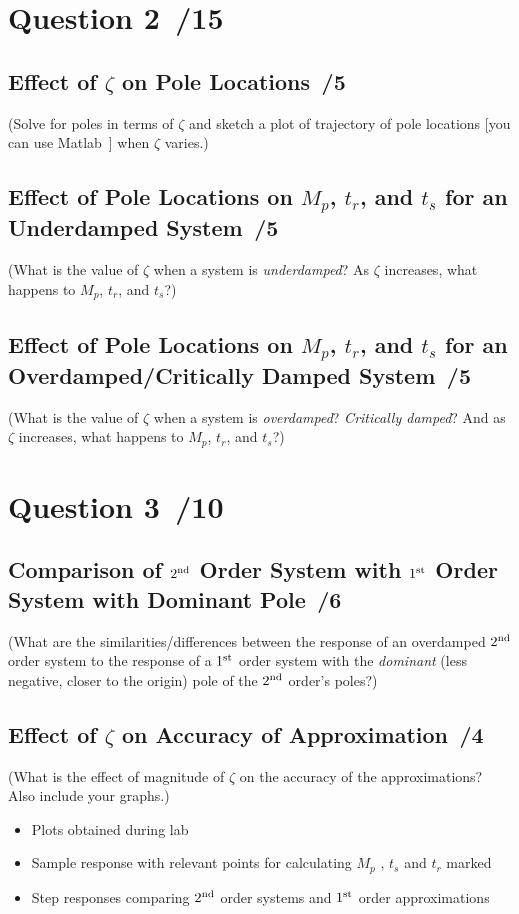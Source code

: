 \documentclass{article}
\newcommand{\score}{\hfill \underline{\hspace{0.65cm}}\,/} %
\newcommand\RR{\textsuperscript{\textregistered}~} %
\begin{document}
\section*{Question 2 \score 15}

\subsection*{Effect of $\zeta$ on Pole Locations \score 5}
(Solve for poles in terms of $\zeta$ and sketch a plot of trajectory of pole locations [you can use {\sc Matlab\RR}] when $\zeta$ varies.)

\subsection*{Effect of Pole Locations on $M_p$, $t_r$, and $t_s$ for an Underdamped System \score 5}
(What is the value of $\zeta$ when a system is \emph{underdamped}? As $\zeta$ increases, what happens to $M_p$, $t_r$, and $t_s$?)

\subsection*{Effect of Pole Locations on $M_p$, $t_r$, and $t_s$ for an Overdamped/Critically Damped System \score 5}
(What is the value of $\zeta$ when a system is \emph{overdamped}? \emph{Critically damped}? And as $\zeta$ increases, what happens to $M_p$, $t_r$, and $t_s$?)

\section*{Question 3 \score 10}

\subsection*{Comparison of $2^{\rm nd}$ Order System with $1^{\rm st}$ Order System with Dominant Pole \score 6}
(What are the similarities/differences between the response of an overdamped $2^{\rm nd}$ order system to the response of a $1^{\rm st}$ order system with the \emph{dominant} (less negative, closer to the origin) pole of the $2^{\rm nd}$ order's poles?)

\subsection*{Effect of $\zeta$ on Accuracy of Approximation \score 4}
(What is the effect of magnitude of $\zeta$ on the accuracy of the approximations? Also include your graphs.)
\newline \\[10mm]
\begin{itemize}
\item Plots obtained during lab
\item Sample response with relevant points for calculating $M_p$ , $t_s$ and $t_r$ marked
\item Step responses comparing $2^{\rm nd}$ order systems and $1^{\rm st}$ order approximations
\end{itemize}
\end{document}
